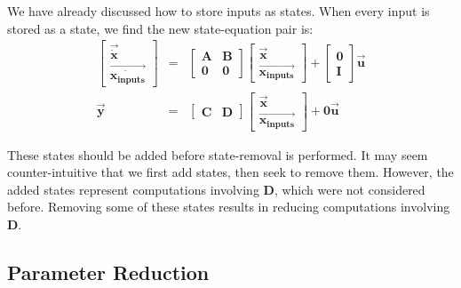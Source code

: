     We have already discussed how to store inputs as states. When
every input is stored as a state, we find the new state-equation
pair is:
\begin{eqnarray*}
\left [ \begin{array} {c} \vec{\dot{\mathbf{x}}} \\
\vec{\dot{\mathbf{x_{inputs}}}} \end{array} \right ] & = & \left [
\begin{array} {cc} \mathbf{A} & \mathbf{B} \\ \mathbf{0} &
\mathbf{0} \end{array} \right ] \left [ \begin{array} {c}
\vec{\mathbf{x}} \\ \vec{\mathbf{x_{inputs}}} \end{array} \right ]
+ \left [ \begin{array} {c} \mathbf{0} \\ \mathbf{I} \end{array}
\right ] \vec{\mathbf{u}} \\
\vec{\mathbf{y}} & = & \left [ \begin{array} {cc} \mathbf{C} &
\mathbf{D} \end{array} \right ] \left [ \begin{array} {c}
\vec{\mathbf{x}} \\ \vec{\mathbf{x_{inputs}}} \end{array} \right ]
+ \mathbf{0} \vec{\mathbf{u}}
\end{eqnarray*}

    These states should be added before state-removal is
performed. It may seem counter-intuitive that we first add states,
then seek to remove them. However, the added states represent
computations involving $\mathbf{D}$, which were not considered
before. Removing some of these states results in reducing
computations involving $\mathbf{D}$.

\subsection{Parameter Reduction}


